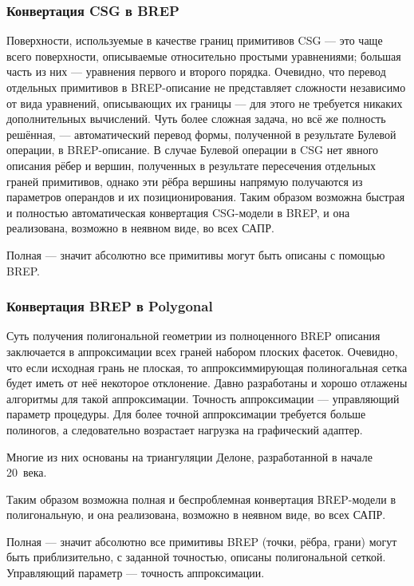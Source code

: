 \subsubsection{Конвертация CSG в BREP}\label{sec:secCSGtoBREP}

Поверхности, используемые в качестве границ примитивов CSG --- это чаще всего поверхности, описываемые относительно простыми уравнениями; большая часть из них --- уравнения первого и второго порядка. Очевидно, что перевод отдельных примитивов в BREP-описание не представляет сложности независимо от вида уравнений, описывающих их границы --- для этого не требуется никаких дополнительных вычислений. Чуть более сложная задача, но всё же полность решённая, --- автоматический перевод формы, полученной в результате Булевой операции, в BREP-описание. В случае Булевой операции в CSG нет явного описания рёбер и вершин, полученных в результате пересечения отдельных граней примитивов, однако эти рёбра вершины напрямую получаются из параметров операндов и их позиционирования. Таким образом возможна быстрая и полностью автоматическая конвертация CSG-модели в BREP, и она реализована, возможно в неявном виде, во всех САПР.

Полная --- значит абсолютно все примитивы могут быть описаны с помощью BREP.

\subsubsection{Конвертация BREP в Polygonal}\label{sec:secBREPtoPolygonal}

Суть получения полигональной геометрии из полноценного BREP описания заключается в аппроксимации всех граней набором плоских фасеток. Очевидно, что если исходная грань не плоская, то аппроксиммирующая полиногальная сетка будет иметь от неё некоторое отклонение.
Давно разработаны и хорошо отлажены алгоритмы для такой аппроксимации. Точность аппроксимации --- управляющий параметр процедуры. Для более точной аппроксимации требуется больше полиногов, а следовательно возрастает нагрузка на графический адаптер.

Многие из них основаны на триангуляции Делоне, разработанной в начале 20~века.

Таким образом возможна полная и \todo беспроблемная \todo конвертация BREP-модели в полигональную, и она реализована, возможно в неявном виде, во всех САПР.

Полная --- значит абсолютно все примитивы BREP (точки, рёбра, грани) могут быть приблизительно, с заданной точностью, описаны полигональной сеткой. Управляющий параметр --- точность аппроксимации.

